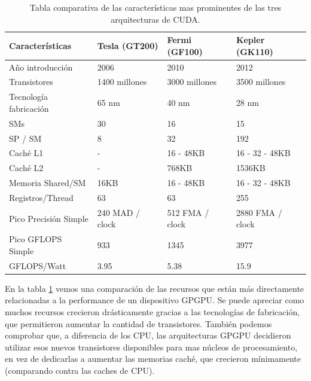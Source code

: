 \begin{table}[h]
  \begin{tabular}{@{}llll@{}}
  \toprule
  Caracter\'isticas        & Tesla (GT200)   & Fermi (GF100)   & Kepler (GK110)   \\ \midrule
  A\~no introducci\'on     & 2006            & 2010            & 2012             \\
  Transistores             & 1400 millones   & 3000 millones   & 3500 millones    \\
  Tecnolog\'ia fabricaci\'on & 65 nm           & 40 nm           & 28 nm            \\
  SMs                      & 30              & 16              & 15               \\
  SP / SM                  & 8               & 32              & 192              \\
  Cach\'e L1               & -               & 16 - 48KB       & 16 - 32 - 48KB   \\
  Cach\'e L2               & -               & 768KB           & 1536KB           \\
  Memoria Shared/SM      & 16KB            & 16 - 48KB       & 16 - 32 - 48KB   \\
  Registros/Thread         & 63              & 63              & 255              \\
  Pico Precisi\'on Simple    & 240 MAD / clock & 512 FMA / clock & 2880 FMA / clock \\
  Pico GFLOPS Simple       & 933             & 1345            & 3977             \\
  GFLOPS/Watt              & 3.95            & 5.38            & 15.9             \\ \bottomrule
  \end{tabular}
\caption{Tabla comparativa de las caracter\'isticas mas prominentes de las tres arquitecturas de CUDA.}
\label{tab:CudaGenerations}
\end{table}

En la tabla \ref{tab:CudaGenerations} vemos una comparaci\'on de las recursos que est\'an m\'as directamente
relacionadas a la performance de un dispositivo GPGPU. Se puede apreciar como muchos recursos
crecieron dr\'asticamente gracias a las tecnolog\'ias de fabricaci\'on, que permitieron aumentar la
cantidad de transistores. Tambi\'en podemos comprobar que, a diferencia de los CPU, las arquitecturas GPGPU
decidieron utilizar esos nuevos transistores disponibles para mas n\'ucleos de procesamiento, en vez
de dedicarlas a aumentar las memorias cach\'e, que crecieron m\'inimamente (comparando contra las caches de CPU).

